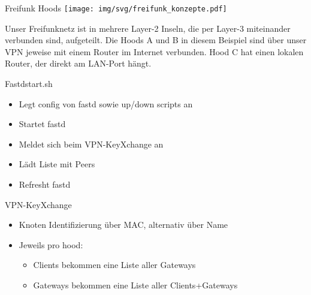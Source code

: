\begin{frame}{Freifunk Hoods}
    \texttt{[image: img/svg/freifunk\_konzepte.pdf]}

    Unser Freifunknetz ist in mehrere Layer-2 Inseln, die per Layer-3 miteinander verbunden sind,
    aufgeteilt. Die Hoods A und B in diesem Beispiel sind über unser VPN jeweise mit einem Router im
    Internet verbunden. Hood C hat einen lokalen Router, der direkt am LAN-Port hängt.
\end{frame}

\begin{frame}{Fastdstart.sh}
    \begin{itemize}
        \item Legt config von fastd sowie up/down scripts an
        \item Startet fastd
        \item Meldet sich beim VPN-KeyXchange an
        \item Lädt Liste mit Peers
        \item Refresht fastd
    \end{itemize}
\end{frame}

\begin{frame}{VPN-KeyXchange}
    \begin{itemize}
        \item Knoten Identifizierung über MAC, alternativ über Name
        \item Jeweils pro hood:
        \begin{itemize}
            \item Clients bekommen eine Liste aller Gateways
            \item Gateways bekommen eine Liste aller Clients+Gateways
        \end{itemize}
    \end{itemize}
\end{frame}
